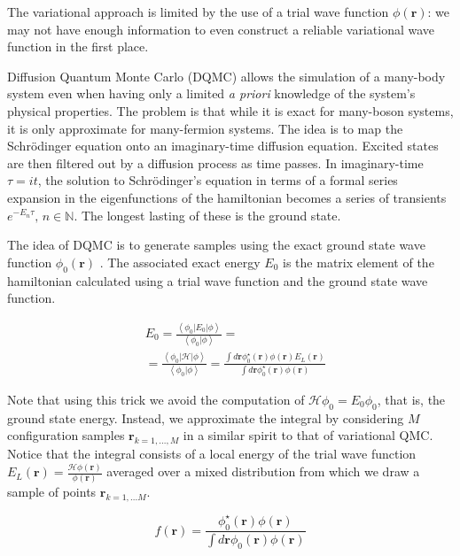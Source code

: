 \documentclass[10pt, twocolumn, twoside]{article}
\begin{document}
The variational approach is limited by the use of a trial wave function $\phi (\bm r)$: we may not have enough information to even construct a reliable variational wave function in the first place. 

Diffusion Quantum Monte Carlo (DQMC) allows the simulation of a many-body system even when having only a limited \emph{a priori} knowledge of the system's physical properties. The problem is that while it is exact for many-boson systems, it is only approximate for many-fermion systems. The idea is to map the Schr\"odinger equation onto  an imaginary-time diffusion equation. Excited states are then filtered out by a diffusion process as time passes. In imaginary-time $\tau =  i t$, the solution to Schr\"odinger's equation in terms of a formal series expansion in the eigenfunctions of the hamiltonian becomes a series of transients $e^{-E_n \tau}, \, n \in \mathbb{N}$. The longest lasting of these is the ground state. \cite{Kosztin1996} \par

The idea of DQMC is to generate samples using the exact ground state wave function $\phi_0 (\bm r)$ \cite{Toulouse2016, Pang2016}. The associated exact energy $E_0$ is the matrix element of the hamiltonian calculated using a trial wave function and the ground state wave function.

\begin{equation}
\begin{split}
&E_0 = \frac{ \left\langle \phi_0 | E_0 | \phi \right\rangle}{\left\langle \phi_0 | \phi \right\rangle} = \\
&= \frac{\left\langle \phi_0 | \mathcal{H} | \phi \right\rangle}{ \left\langle\phi_0 | \phi \right\rangle} = \frac{\int d\bm r \phi_0^\star (\bm r) \phi (\bm r) E_L (\bm r)}{\int d\bm r\phi_0^\star (\bm r) \phi (\bm r)}
\end{split}
\end{equation}

Note that using this trick we avoid the computation of $\mathcal{H} \phi_0 = E_0 \phi_0$, that is, the ground state energy. Instead, we approximate the integral by considering $M$ configuration samples $\bm r_{k = 1,..., M}$ in a similar spirit to that of variational QMC. Notice that the integral consists of a local energy of the trial wave function $E_L (\bm r) = \frac{\mathcal{H} \phi (\bm r)}{\phi (\bm r)}$ averaged over a mixed distribution from which we draw a sample of points $\bm r_{k=1,...M}$.

\begin{equation}
f(\bm r) = \frac{\phi_0^\star (\bm r) \phi (\bm r) }{ \int d\bm r  \phi_0 (\bm r) \phi (\bm r)}
\end{equation}
\end{document}
